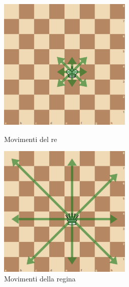 \newpage

\begin{figure}[!htb]
\begin{minipage}[b]{7cm}
\centering
\includegraphics[width=6.3cm]{frontmatter/figure/movimento_re.pdf}
\caption{Movimenti del re}
\label{fig:re}
\end{minipage}
\hspace{1mm}
\begin{minipage}[b]{7cm}
\centering
\includegraphics[width=6.3cm]{frontmatter/figure/movimento_regina.pdf}
\caption{Movimenti della regina}
\label{fig:regina}
\end{minipage}
\end{figure}

